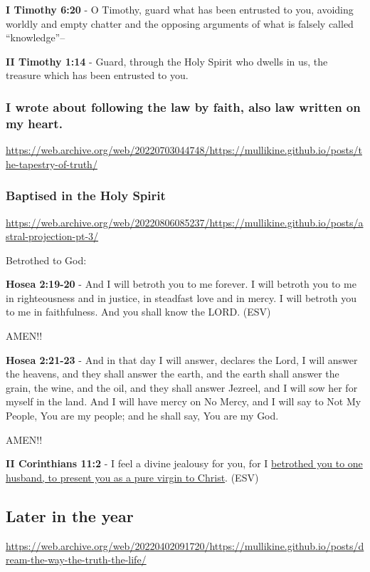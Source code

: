 \documentclass[11pt]{article}
\begin{document}
\textbf{I Timothy 6:20} - O Timothy, guard what has been entrusted to you, avoiding worldly and empty chatter and the opposing arguments of what is falsely called “knowledge”--

\textbf{II Timothy 1:14} - Guard, through the Holy Spirit who dwells in us, the treasure which has been entrusted to you.

\subsubsection{I wrote about following the law by faith, also law written on my heart.}
\label{sec:org03c8d57}

\url{https://web.archive.org/web/20220703044748/https://mullikine.github.io/posts/the-tapestry-of-truth/}

\subsubsection{Baptised in the Holy Spirit}
\label{sec:org95b032a}
\url{https://web.archive.org/web/20220806085237/https://mullikine.github.io/posts/astral-projection-pt-3/}

Betrothed to God:

\textbf{Hosea 2:19-20} - And I will betroth you to me forever. I will betroth you to me in righteousness and in justice, in steadfast love and in mercy. I will betroth you to me in faithfulness. And you shall know the LORD. (ESV)

AMEN!!

\textbf{Hosea 2:21-23} - And in that day I will answer, declares the Lord, I will answer the heavens, and they shall answer the earth, and the earth shall answer the grain, the wine, and the oil, and they shall answer Jezreel, and I will sow her for myself in the land. And I will have mercy on No Mercy, and I will say to Not My People, You are my people; and he shall say, You are my God.

AMEN!!

\textbf{II Corinthians 11:2} - I feel a divine jealousy for you, for I \uline{betrothed you to one husband, to present you as a pure virgin to Christ}. (ESV)

\subsection{Later in the year}
\label{sec:orgf5ec462}
\url{https://web.archive.org/web/20220402091720/https://mullikine.github.io/posts/dream-the-way-the-truth-the-life/}
\end{document}

